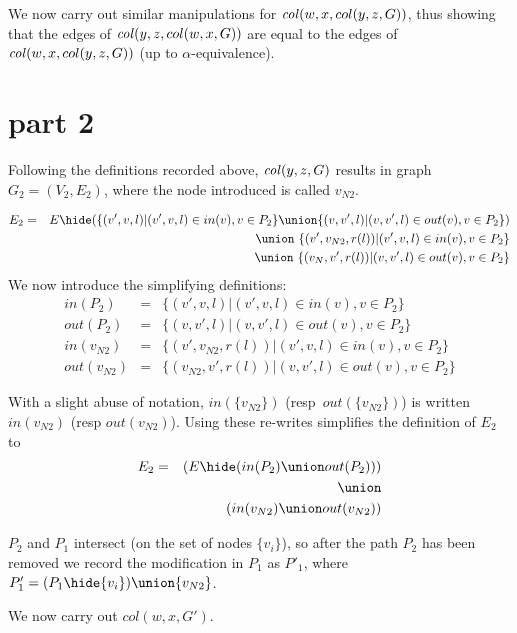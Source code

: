\pagebreak

We now carry out similar manipulations for $\mathit{col}(w,x,col(y,z,G))$, thus showing that the edges of $\mathit{col}(y,z,col(w,x,G))$ are equal to the edges of  $\mathit{col}(w,x,col(y,z,G))$ (up to $\alpha$-equivalence). 

\section{part 2}

Following the definitions recorded above, $\mathit{col}(y,z,G)$ results in graph $G_2=(V_2,E_2)$, where the node introduced is called $v_{N2}$. 

\begin{eqnarray*}
  E_2 & = & E\hide (
                   \{(v',v,l)|(v',v,l) \in in(v), v\in P_2\}
                   \union
                   \{(v,v',l)|(v,v',l) \in out(v), v\in P_2\}
                  )\\
  && \union\ \{(v',v_{N2},r(l))|(v',v,l) \in in(v), v\in P_2\}\\
  && \union\ \{(v_{N},v',r(l))|(v,v',l) \in out(v), v\in P_2\}
\end{eqnarray*}
We now introduce the simplifying definitions:
\begin{eqnarray*}
 in(P_2)   &=& \{(v',v,l)|(v',v,l) \in in(v), v\in P_2\} \\ 
 out(P_2)  &=& \{(v,v',l)|(v,v',l) \in out(v), v\in P_2\}\\
 in(v_{N2}) &=& \{(v',v_{N2},r(l))|(v',v,l) \in in(v), v\in P_2\} \\
 out(v_{N2})&=& \{(v_{N2},v',r(l))|(v,v',l) \in out(v), v\in P_2\} 
\end{eqnarray*}

With a slight abuse of notation, $in(\{v_{N2}\})$ (resp\ $out(\{v_{N2}\})$)  is written $in(v_{N2})$ (resp $out(v_{N2})$). Using these re-writes simplifies the definition of $E_2$ to 
\begin{eqnarray*}
  E_2  &=& ( E\hide(in(P_2) \union out(P_2)) ) \\
       &&\union\\
       && ( in(v_{N2}) \union out(v_{N2}) )
\end{eqnarray*}
       
$P_2$ and $P_1$ intersect (on the set of nodes $\{v_i\}$), so after the path $P_2$ has been removed  we record the modification in $P_1$ as $P'_1$, where $P'_1 = (P_1\hide\{v_i\})\union\{v_{N2}\}$.

We now carry out $col(w,x,G')$. 

